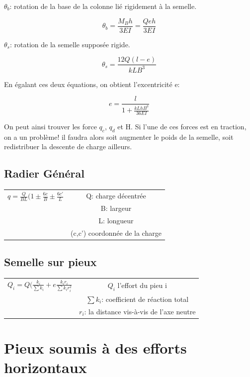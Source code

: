 $\theta_b$: rotation de la base de la colonne lié rigidement à la semelle.

$$ \theta_b= \frac{M_B h}{3EI} = \frac{Q e h}{3EI}$$

$\theta_s$: rotation de la semelle supposée rigide.

$$ \theta_s=\frac{12Q(l-e)}{kLB^3} $$

En égalant ces deux équations, on obtient l'excentricité e:

$$ e = \frac{l}{1+\frac{kLhB^3}{36EI}} $$

On peut ainsi trouver les force $q_c$, $q_d$ et H. Si l'une de ces forces est en traction, on a un problème! il faudra alors soit augmenter le poids de la semelle, soit redistribuer la descente de charge ailleurs.

\subsection{Radier Général}

\begin{center}
\begin{tabular}{c|c}
$q=\frac{Q}{BL}(1\pm \frac{6c}{B} \pm \frac{6c'}{L}$
        & Q: charge décentrée \\
        & B: largeur \\
        & L: longueur \\
        & (c,c') coordonnée de la charge 
\end{tabular}
\end{center}

\subsection{Semelle sur pieux}

\begin{center}
\begin{tabular}{c|c}
$Q_i = Q(\frac{k_i}{\sum k_i}+e\frac{k_i r_i}{\sum k_i r_i^2}$
        & $Q_i$ l'effort du pieu i \\
        & $\sum k_i$: coefficient de réaction total \\
        & $r_i$: la distance vis-à-vis de l'axe neutre
\end{tabular}
\end{center}

\section{Pieux soumis à des efforts horizontaux}

